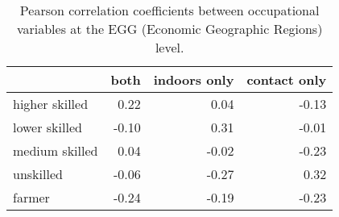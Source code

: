 \begin{table}

\caption{\label{tab:tab:occcor}Pearson correlation coefficients between occupational variables at the EGG (Economic Geographic Regions) level.}
\centering
\begin{tabular}[t]{l|r|r|r}
\hline
  & both & indoors only & contact only\\
\hline
higher skilled & 0.22 & 0.04 & -0.13\\
\hline
lower skilled & -0.10 & 0.31 & -0.01\\
\hline
medium skilled & 0.04 & -0.02 & -0.23\\
\hline
unskilled & -0.06 & -0.27 & 0.32\\
\hline
farmer & -0.24 & -0.19 & -0.23\\
\hline
\end{tabular}
\end{table}
